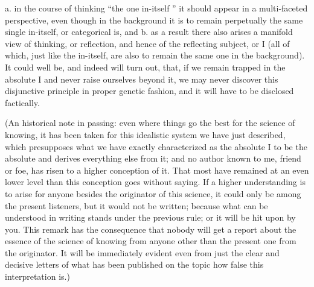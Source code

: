 a. in the course of thinking “the one in-itself ”
it should appear in a multi-faceted perspective,
even though in the background it is to remain
perpetually the same single in-itself, or categorical is, and
b. as a result there also arises a manifold view of thinking,
or reflection, and hence of the reflecting subject, or I
(all of which, just like the in-itself, are also
to remain the same one in the background).
It could well be, and indeed will turn out, that,
if we remain trapped in the absolute I
and never raise ourselves beyond it,
we may never discover this disjunctive principle
in proper genetic fashion,
and it will have to be disclosed factically.

(An historical note in passing:
even where things go the best for the science of knowing,
it has been taken for this idealistic system we have just described,
which presupposes what we have exactly characterized as
the absolute I to be the absolute
and derives everything else from it;
and no author known to me, friend or foe,
has risen to a higher conception of it.
That most have remained at an even lower level
than this conception goes without saying.
If a higher understanding is to arise
for anyone besides the originator of this science,
it could only be among the present listeners,
but it would not be written;
because what can be understood in writing
stands under the previous rule;
or it will be hit upon by you.
This remark has the consequence that nobody will get
a report about the essence of the science of knowing
from anyone other than the present one from the originator.
It will be immediately evident even from just
the clear and decisive letters of
what has been published on the topic
how false this interpretation is.)

